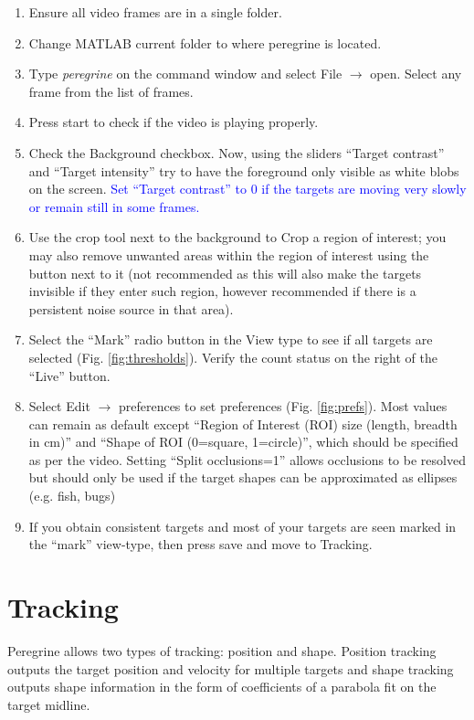 \documentclass[11pt]{article}
\begin{document}
\begin{enumerate}
\item Ensure all video frames are in a single folder.
\item Change MATLAB current folder to where peregrine is located.
\item Type \emph{peregrine} on the command window and select File $\rightarrow$ open. Select any frame from the list of frames.
\item Press start to check if the video is playing properly.
\item Check the Background checkbox. Now, using the sliders ``Target contrast'' and ``Target intensity'' try to have the foreground only visible as white blobs on the screen. \textcolor{blue}{Set ``Target contrast'' to 0 if the targets are moving very slowly or remain still in some frames.}
\item Use the crop tool next to the background to Crop a region of interest; you may also remove unwanted areas within the region of interest using the button next to it (not recommended as this will also make the targets invisible if they enter such region, however recommended if there is a persistent noise source in that area).
\item Select the ``Mark'' radio button in the View type to see if all targets are selected (Fig. \ref{fig:thresholds}). Verify the count status on the right of the ``Live'' button.
\item Select Edit $\rightarrow$ preferences to set preferences (Fig. \ref{fig:prefs}). Most values can remain as default except ``Region of Interest (ROI) size (length, breadth in cm)'' and ``Shape of ROI (0=square, 1=circle)'', which should be specified as per the video. Setting ``Split occlusions=1'' allows occlusions to be resolved but should only be used if the target shapes can be approximated as ellipses (e.g. fish, bugs)
\item If you obtain consistent targets and most of your targets are seen marked in the ``mark'' view-type, then press save and move to Tracking.
\end{enumerate}


\section{Tracking}
Peregrine allows two types of tracking: position and shape. Position tracking outputs the target position and velocity for multiple targets and shape tracking outputs shape information in the form of coefficients of a parabola fit on the target midline. 
\end{document}
